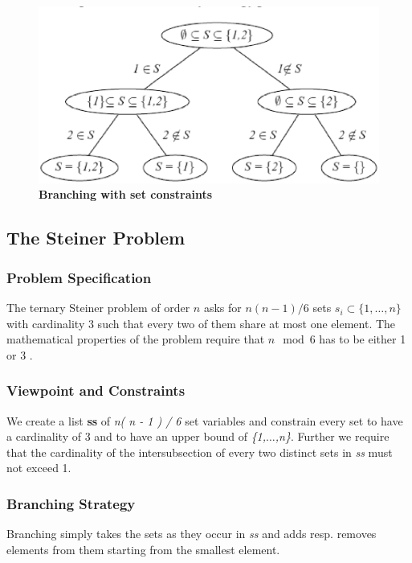 \documentclass[a4paper,halfparskip]{scrartcl}
\begin{document}
\begin{figure}[htpb]
\centerline{\includegraphics*[scale=0.8]{figs/setdistribution.eps}}
\caption{\textbf{Branching with set constraints}}
\label{figure 12}
\end{figure}





\newpage
\subsection{The Steiner Problem}
\subsubsection{Problem Specification}
The ternary Steiner problem of order $n$ asks for $n( n - 1 ) / 6$
sets $s_i \subset \{1,\ldots,n\}$ with cardinality 3 such that every
two of them share at most one element. The mathematical properties of
the problem require that $n \mod 6$ has to be either 1 or 3
\cite{11}.

\subsubsection{Viewpoint and Constraints}
We create a list \textbf{ss} of \emph{n( n - 1 ) / 6} set variables 
and constrain every set to have a cardinality of 3 and to have an 
upper bound of \emph{\{1,$\ldots$,n\}}. Further we require that the cardinality 
of the intersubsection of every two distinct sets in \emph{ss} must 
not exceed 1. 

\subsubsection{Branching Strategy}
Branching simply takes the sets as they occur in \emph{ss} 
and adds resp. removes elements from them starting from 
the smallest element. 
\end{document}
